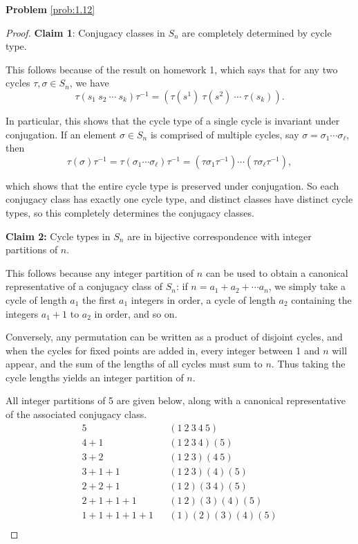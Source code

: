 \textbf{Problem} \ref{prob:1.12}
\begin{proof}

\textbf{Claim 1}: Conjugacy classes in $S_n$ are completely determined by cycle type.

This follows because of the result on homework 1, which says that for any two cycles $\tau,\sigma\in S_n$, we have
$$\tau(s_1~s_2~\cdots~s_k)\tau^{-1} = (\tau(s^1)~\tau(s^2)~\cdots~\tau(s_k)).$$

In particular, this shows that the cycle type of a single cycle is invariant under conjugation. If an element $\sigma \in S_n$ is comprised of multiple cycles, say $\sigma = \sigma_1 \cdots \sigma_\ell$, then
$$
\tau(\sigma)\tau^{-1} = \tau(\sigma_1 \cdots \sigma_\ell)\tau^{-1} 
= (\tau\sigma_1\tau^{-1})\cdots(\tau\sigma_\ell\tau^{-1}),
$$

which shows that the entire cycle type is preserved under conjugation. So each conjugacy class has exactly one cycle type, and distinct classes have distinct cycle types, so this completely determines the conjugacy classes.

\textbf{Claim 2:} Cycle types in $S_n$ are in bijective correspondence with integer partitions of $n$.

This follows because any integer partition of $n$ can be used to obtain a canonical representative of a conjugacy class of $S_n$: if $n = a_1 + a_2 + \cdots a_n$, we simply take a cycle of length $a_1$ the first $a_1$ integers in order, a cycle of length $a_2$ containing the integers $a_1 + 1$ to $a_2$ in order, and so on. 

Conversely, any permutation can be written as a product of disjoint cycles, and when the cycles for fixed points are added in, every integer between 1 and $n$ will appear, and the sum of the lengths of all cycles must sum to $n$. Thus taking the cycle lengths yields an integer partition of $n$.

All integer partitions of 5 are given below, along with a canonical representative of the associated conjugacy class. 
\begin{align*}
    5 && (1~2~3~4~5) \\
    4 + 1 && (1~2~3~4)(5) \\
    3 + 2 &&  (1~2~3)(4~5) \\
    3 + 1 + 1 && (1~2~3)(4)(5) \\
    2 + 2 + 1 && (1~2)(3~4)(5) \\
    2 + 1 + 1 + 1 && (1~2)(3)(4)(5) \\
    1 + 1 + 1 + 1 + 1 && (1)(2)(3)(4)(5) \\
\end{align*}

\end{proof}